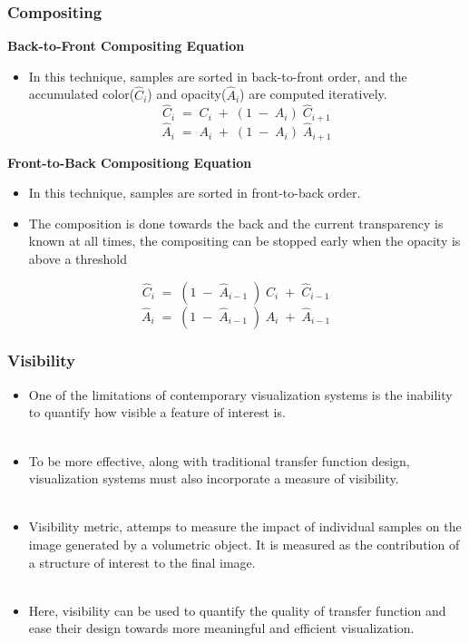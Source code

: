 \documentclass{beamer}
\begin{document}
\begin{frame}
\frametitle{Compositing}
\textbf{Back-to-Front Compositing Equation}
\begin{itemize}
\item In this technique, samples are sorted in back-to-front order, and the accumulated color($\hat{C}_i $) and opacity($\hat{A}_i $) are computed iteratively.
\begin{equation}
\hat{C}_i \; = \; C_i \; + \; (1 \; - \; A_i ) \; \hat{C}_{i+1} 
\end{equation}
\begin{equation}
\hat{A}_i \; = \; A_i \; + \; (1 \; - \; A_i ) \; \hat{A}_{i+1} 
\end{equation}
\end{itemize}
\textbf{Front-to-Back Compositiong Equation}
\begin{itemize}
\item In this technique, samples are sorted in front-to-back order.
\item The composition is done towards the back and the current transparency is known at all times, the compositing can be stopped early when the opacity is above a threshold
\end{itemize}
\begin{equation}
\hat{C}_i \; = \; (1 \; - \; \hat{A}_{i-1} \; ) \; C_i \; + \; \hat{C}_{i-1}    
\end{equation}
\begin{equation}
\hat{A}_i \; = \; (1 \; - \; \hat{A}_{i-1} \; ) \; A_i \; + \; \hat{A}_{i-1}    
\end{equation}
\end{frame}



\begin{frame}
\frametitle{ Visibility}
\begin{itemize}
\item One of the limitations of contemporary visualization systems is the inability to quantify how visible a feature of interest is. \\ $ $
\item To be more effective, along with traditional transfer function design, visualization systems must also incorporate a measure of visibility. \\ $ $
\item Visibility metric, attemps to measure the impact of individual samples on the image generated by a volumetric object. It is measured as the contribution of a structure of interest to the final image. \\ $ $
\item Here, visibility can be used to quantify the quality of transfer function and ease their design towards more meaningful and efficient visualization. 
\end{itemize}
\end{frame}
\end{document}
